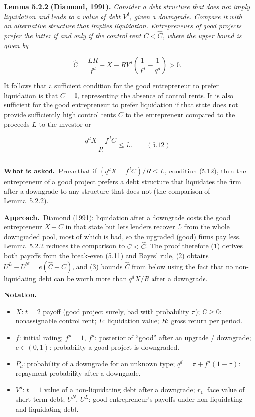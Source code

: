 \documentclass[11pt,a4paper]{article}
\newcommand{\notation}{\par\noindent\textbf{Notation.}}
\newcommand{\asked}{\par\medskip\noindent\textbf{What is asked.}~}
\newcommand{\approach}{\par\smallskip\noindent\textbf{Approach.}~}
\newcommand{\stmtend}{\par\endgroup\nopagebreak\noindent\rule{\linewidth}{0.4pt}\par\medskip}
\begin{document}
\textbf{Lemma 5.2.2 (Diamond, 1991).} \emph{Consider a debt structure that does not imply
liquidation and leads to a value of debt \(V^d\), given a downgrade. Compare it with an alternative
structure that implies liquidation. Entrepreneurs of good projects prefer the latter if and only if
the control rent \(C < \widehat C\), where the upper bound is given by}

\[\widehat C = \frac{LR}{f^d} - X - RV^d\left(\frac{1}{f^d} - \frac{1}{q^d}\right) > 0.\]

It follows that a sufficient condition for the good entrepreneur to prefer liquidation is that
\(C = 0\), representing the absence of control rents. It is also sufficient for the good
entrepreneur to prefer liquidation if that state does not provide sufficiently high control rents
\(C\) to the entrepreneur compared to the proceeds \(L\) to the investor or

\[\frac{q^d X + f^d C}{R} \le L. \qquad (5.12)\]
\stmtend

\asked Prove that if $(q^dX+f^dC)/R\le L$, condition (5.12), then the entrepreneur of a good project
prefers a debt structure that liquidates the firm after a downgrade to any structure that does not
(the comparison of Lemma~5.2.2).

\approach Diamond (1991): liquidation after a downgrade costs the good entrepreneur $X+C$ in that state
but lets lenders recover $L$ from the whole downgraded pool, most of which is bad, so the upgraded (good)
firms pay less. Lemma~5.2.2 reduces the comparison to $C<\widehat C$. The proof therefore (1) derives
both payoffs from the break-even (5.11) and Bayes' rule, (2) obtains $U^L-U^N=e(\widehat C-C)$, and
(3) bounds $\widehat C$ from below using the fact that no non-liquidating debt can be worth more than
$q^dX/R$ after a downgrade.

\notation
\begin{itemize}
  \item $X$: $t=2$ payoff (good project surely, bad with probability $\pi$); $C\ge0$: nonassignable control rent; $L$: liquidation value; $R$: gross return per period.
  \item $f$: initial rating; $f^u=1$, $f^d$: posterior of ``good'' after an upgrade / downgrade; $e\in(0,1)$: probability a good project is downgraded.
  \item $P_d$: probability of a downgrade for an unknown type; $q^d=\pi+f^d(1-\pi)$: repayment probability after a downgrade.
  \item $V^d$: $t=1$ value of a non-liquidating debt after a downgrade; $r_1$: face value of short-term debt; $U^N$, $U^L$: good entrepreneur's payoffs under non-liquidating and liquidating debt.
\end{itemize}
\end{document}
